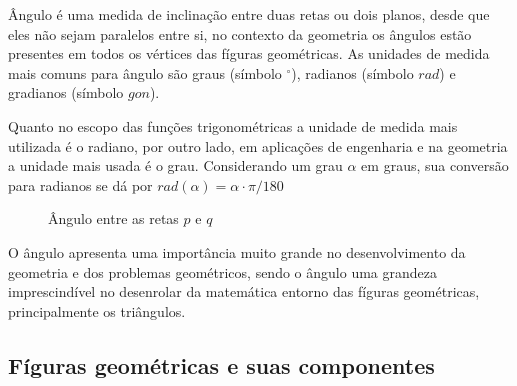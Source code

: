 \begin{multicols*}{2}
    Ângulo é uma medida de inclinação entre duas retas ou dois planos, desde que eles não sejam paralelos entre si, no
    contexto da geometria os ângulos estão presentes em todos os vértices das fíguras geométricas.
    As unidades de medida mais comuns para ângulo são graus (símbolo $^{\circ}$), radianos (símbolo $rad$) e gradianos (símbolo $gon$).

    Quanto no escopo das funções trigonométricas a unidade de medida mais utilizada é o radiano, por outro lado,
    em aplicações de engenharia e na geometria a unidade mais usada é o grau. Considerando um grau $\alpha$ em graus,
    sua conversão para radianos se dá por $rad(\alpha) = \alpha\cdot\pi/180$

    \begin{figure}[H]
        \centering
        \caption{Ângulo entre as retas $p$ e $q$}
    \end{figure}

    O ângulo apresenta uma importância muito grande no desenvolvimento da geometria e dos problemas geométricos, sendo o
    ângulo uma grandeza imprescindível no desenrolar da matemática entorno das fíguras geométricas, principalmente os
    triângulos.

    \subsection*{Fíguras geométricas e suas componentes}


\end{multicols*}
